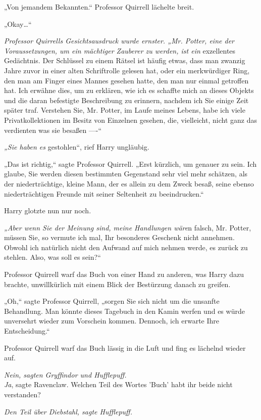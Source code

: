 {„Von jemandem Bekannten.“ Professor Quirrell lächelte breit.

„Okay…“

\emph{Professor Quirrells Gesichtsausdruck wurde ernster. „Mr. Potter, eine der Voraussetzungen, um ein mächtiger Zauberer zu werden, ist ein} exzellentes Gedächtnis. Der Schlüssel zu einem Rätsel ist häufig etwas, dass man zwanzig Jahre zuvor in einer alten Schriftrolle gelesen hat, oder ein merkwürdiger Ring, den man am Finger eines Mannes gesehen hatte, den man nur einmal getroffen hat. Ich erwähne dies, um zu erklären, wie ich es schaffte mich an dieses Objekts und die daran befestigte Beschreibung zu erinnern, nachdem ich Sie einige Zeit später traf. Verstehen Sie, Mr. Potter, im Laufe meines Lebens, habe ich viele Privatkollektionen im Besitz von Einzelnen gesehen, die, vielleicht, nicht ganz das verdienten was sie besaßen ----“

\emph{„Sie haben es} gestohlen“, rief Harry ungläubig.

„Das ist richtig,“ sagte Professor Quirrell. „Erst kürzlich, um genauer zu sein. Ich glaube, Sie werden diesen bestimmten Gegenstand sehr viel mehr schätzen, als der niederträchtige, kleine Mann, der es allein zu dem Zweck besaß, seine ebenso niederträchtigen Freunde mit seiner Seltenheit zu beeindrucken.“

Harry glotzte nun nur noch.

\emph{„Aber wenn Sie der Meinung sind, meine Handlungen wäre}n falsch, Mr. Potter, müssen Sie, so vermute ich mal, Ihr besonderes Geschenk nicht annehmen. Obwohl ich natürlich nicht den Aufwand auf mich nehmen werde, es zurück zu stehlen. Also, was soll es sein?“

Professor Quirrell warf das Buch von einer Hand zu anderen, was Harry dazu brachte, unwillkürlich mit einem Blick der Bestürzung danach zu greifen.

„Oh,“ sagte Professor Quirrell, „sorgen Sie sich nicht um die unsanfte Behandlung. Man könnte dieses Tagebuch in den Kamin werfen und es würde unversehrt wieder zum Vorschein kommen. Dennoch, ich erwarte Ihre Entscheidung.“

Professor Quirrell warf das Buch lässig in die Luft und fing es lächelnd wieder auf.

\emph{Nein, sagten Gryffindor und Hufflepuff.}\\ \emph{Ja}, sagte Ravenclaw. Welchen Teil des Wortes 'Buch' habt ihr beide nicht verstanden?

\emph{Den Teil über Diebstahl, sagte Hufflepuff.}

}
